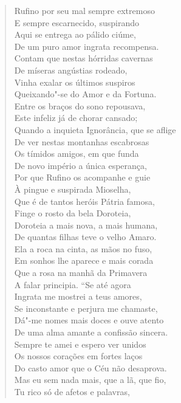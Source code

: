 \begin{verse}
Rufino por seu mal sempre extremoso\\
E sempre escarnecido, suspirando\\
Aqui se entrega ao pálido ciúme,\\
De um puro amor ingrata recompensa.\\
Contam que nestas hórridas cavernas\\
De míseras angústias rodeado,\\
Vinha exalar os últimos suspiros\\
Queixando"-se do Amor e da Fortuna.\\		\index{\Amor} \index{\Fortu}
Entre os braços do sono repousava,\\
Este infeliz já de chorar cansado;\\
Quando a inquieta Ignorância, que se aflige\\		\index{\Ignor}
De ver nestas montanhas escabrosas\\
Os tímidos amigos, em que funda\\
De novo império a única esperança,\\
Por que Rufino os acompanhe e guie\\
À pingue e suspirada Mioselha,\\
Que é de tantos heróis Pátria famosa,\\
Finge o rosto da bela Doroteia,\\
Doroteia a mais nova, a mais humana,\\
De quantas filhas teve o velho Amaro.\\
Ela a roca na cinta, as mãos no fuso,\\
Em sonhos lhe aparece e mais corada\\
Que a rosa na manhã da Primavera\\
A falar principia. ``Se até agora\\
Ingrata me mostrei a teus amores,\\
Se inconstante e perjura me chamaste,\\
Dá"-me nomes mais doces e ouve atento\\
De uma alma amante a confissão sincera.\\
Sempre te amei e espero ver unidos\\
Os nossos corações em fortes laços\\
Do casto amor que o Céu não desaprova.\\
Mas eu sem nada mais, que a lã, que fio,\\
Tu rico só de afetos e palavras,\\

\end{verse}
